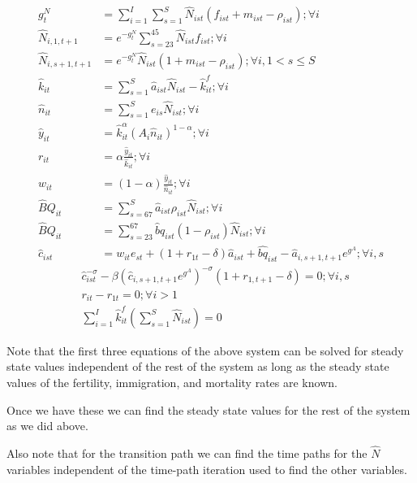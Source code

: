 \documentclass[letterpaper,12pt]{article}
\theoremstyle{definition}
\numberwithin{equation}{section}
\begin{document}
\begin{spacing}{1.5}
	\begin{align}
		g^N_t & = \sum_{i=1}^I \sum_{s=1}^S \hat N_{ist} (f_{ist}+m_{ist}-\rho_{ist}) ; \forall i\\
		\hat N_{i,1,t+1} & = e^{-g^N_t}\sum_{s=23}^{45} \hat N_{ist} f_{ist} ; \forall i\\
		\hat N_{i,s+1,t+1} & = e^{-g^N_t}\hat N_{ist} (1+m_{ist}-\rho_{ist}); \forall i, 1<s\le S \\
		\hat k_{it} & = \sum_{s=1}^S \hat a_{ist} \hat N_{ist} - \hat k_{it}^f; \forall i \\
		\hat n_{it} & = \sum_{s=1}^S e_{is} \hat N_{ist}; \forall i \\
		\hat y_{it} & = \hat k_{it}^\alpha \left( A_{i} \hat n_{it} \right)^{1-\alpha} ; \forall i \\
		r_{it} & = \alpha \frac{\hat y_{it}}{\hat k_{it}}; \forall i \\
		w_{it} & = (1-\alpha) \frac{\hat y_{it}}{\hat n_{it}}; \forall i \\
		\hat BQ_{it} & = \sum_{s=67}^S \hat a_{ist} \rho_{ist} \hat N_{ist} ; \forall i \\
		\hat BQ_{it} & = \sum_{s=23}^{67} \hat bq_{ist} (1-\rho_{ist}) \hat N_{ist}	; \forall i \\
		\hat c_{ist} & = w_{it} e_{st} + (1+r_{1t}-\delta)\hat a_{ist} + \hat{bq}_{ist} - \hat a_{i,s+1,t+1}e^{g^A} ; \forall i,s 
	\end{align}
	\begin{align}
		& \hat c_{ist}^{-\sigma} - \beta \left(\hat c_{i,s+1,t+1} e^{g^A}\right)^{-\sigma}(1+r_{1,t+1}-\delta) = 0; \forall i,s \\ 
		& r_{it} - r_{1t} = 0; \forall i>1 \\
		& \sum_{i=1}^I \hat k^f_{it} \left( \sum_{s=1}^S \hat N_{ist} \right) = 0
	\end{align}

	Note that the first three equations of the above system can be solved for steady state values independent of the rest of the system as long as the steady state values of the fertility, immigration, and mortality rates are known.

	Once we have these we can find the steady state values for the rest of the system as we did above.

	Also note that for the transition path we can find the time paths for the $\hat N$ variables independent of the time-path iteration used to find the other variables.

\newpage

\end{spacing}
\end{document}
